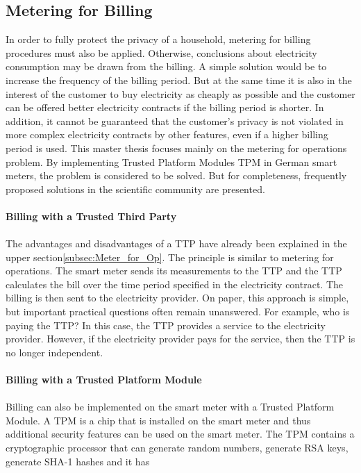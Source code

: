 \subsection{Metering for Billing}
In order to fully protect the privacy of a household, metering for billing procedures must also be applied. Otherwise, conclusions about electricity consumption may be drawn from the billing. A simple solution would be to increase the frequency of the billing period. But at the same time it is also in the interest of the customer to buy electricity as cheaply as possible and the customer can be offered better electricity contracts if the billing period is shorter. In addition, it cannot be guaranteed that the customer's privacy is not violated in more complex electricity contracts by other features, even if a higher billing period is used. %
This master thesis focuses mainly on the metering for operations problem. 
By implementing Trusted Platform Modules \gls{TPM} in German smart meters, the problem is considered to be solved. But for completeness, frequently proposed solutions in the scientific community are presented.\\
\\
\textbf{Billing with a Trusted Third Party}
\\
\\
The advantages and disadvantages of a \gls{TTP} have already been explained in the upper section\ref{subsec:Meter_for_Op}. The principle is similar to metering for operations. The smart meter sends its measurements to the \gls{TTP} and the \gls{TTP} calculates the bill over the time period specified in the electricity contract. The billing is then sent to the electricity provider. On paper, this approach is simple, but important practical questions often remain unanswered. For example, who is paying the \gls{TTP}? In this case, the \gls{TTP} provides a service to the electricity provider. However, if the electricity provider pays for the service, then the \gls{TTP} is no longer independent.\\
\\
\textbf{Billing with a Trusted Platform Module}
\\
\\
Billing can also be implemented on the smart meter with a Trusted Platform Module. A \gls{TPM} is a chip that is installed on the smart meter and thus additional security features can be used on the smart meter. The \gls{TPM} contains a cryptographic processor that can generate random numbers, generate RSA keys, generate SHA-1 hashes and it has
